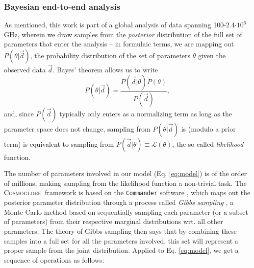 \documentclass{aa}
\newcommand{\dv}[0]{\vec{d}}
\def\Cosmoglobe{\textsc{Cosmoglobe}}
\def\Commander{\texttt{Commander} }
\begin{document}
\subsubsection{Bayesian end-to-end analysis}
As mentioned, this work is part of a global analysis of data spanning
100-2.4$\cdot 10^6$ GHz, wherein we draw samples from the \emph{posterior}
distribution of the full set of parameters that enter the analysis
\citep{CG02_01} -- in formulaic terms, we are mapping out $P(\theta | \dv)$,
the probability distribution of the set of parameters $\theta$ given the
observed data $\dv$. Bayes' theorem allows us to write
\begin{equation}
    \label{eq:bayestheorem}
    P(\theta|\dv) = \frac{P(\dv|\theta)P(\theta)}{P(\dv)},
\end{equation}
and, since $P(\dv)$ typically only enters as a normalizing term as long as the
parameter space does not change, sampling from $P(\theta|\dv)$ is (modulo a
prior term) is equivalent to sampling from
$P(\dv|\theta)\equiv\mathcal{L}(\theta)$, the so-called \emph{likelihood}
function.

The number of parameters involved in our model (Eq. \ref{eq:model}) is of the
order of millions, making sampling from the likelihood function a non-trivial
task. The \Cosmoglobe\ framework is based on the \Commander software
\citep{eriksen:2004,seljebotn:2019,bp03}, which maps out the posterior
parameter distribution through a process called \emph{Gibbs sampling}
\citep[e.g.,][]{geman:1984}, a Monte-Carlo method based on sequentially
sampling each parameter (or a subset of parameters) from their respective
marginal distributions wrt. all other parameters. The theory of Gibbs sampling
then says that by combining these samples into a full set for all the
parameters involved, this set will represent a proper sample from the joint
distribution. Applied to Eq. \ref{eq:model}, we get a sequence of operations as
follows:
\end{document}
